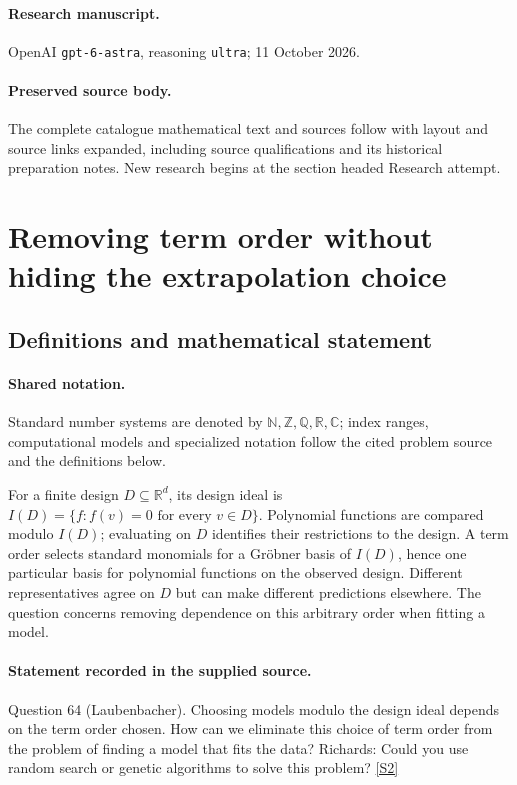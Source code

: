 \documentclass[11pt]{article}
\begin{document}
\paragraph{Research manuscript.} OpenAI \texttt{gpt-6-astra}, reasoning \texttt{ultra}; 11 October 2026.
\paragraph{Preserved source body.} The complete catalogue mathematical text and sources follow with layout and source links expanded, including source qualifications and its historical preparation notes. New research begins at the section headed Research attempt.

\section{Removing term order without hiding the extrapolation choice}\label{statement}

\subsection{Definitions and mathematical statement}

\paragraph{Shared notation.}Standard number systems are denoted by $\mathbb N,\mathbb Z,\mathbb Q,\mathbb R,\mathbb C$; index ranges, computational models and specialized notation follow the cited problem source and the definitions below.


For a finite design $D\subseteq\mathbb R^d$, its design ideal is $I(D)=\{f:f(v)=0\text{ for every }v\in D\}$. Polynomial functions are compared modulo $I(D)$; evaluating on $D$ identifies their restrictions to the design. A term order selects standard monomials for a Gröbner basis of $I(D)$, hence one particular basis for polynomial functions on the observed design. Different representatives agree on $D$ but can make different predictions elsewhere. The question concerns removing dependence on this arbitrary order when fitting a model.
\paragraph{Statement recorded in the supplied source.}
Question 64 (Laubenbacher). Choosing models modulo the design ideal depends on the term order chosen. How can we eliminate this choice of term order from the problem of finding a model that fits the data? Richards: Could you use random search or genetic algorithms to solve this problem? \href{https://aimath.org/WWN/compalgstat/compalgstat.pdf}{[S2]}
\end{document}
